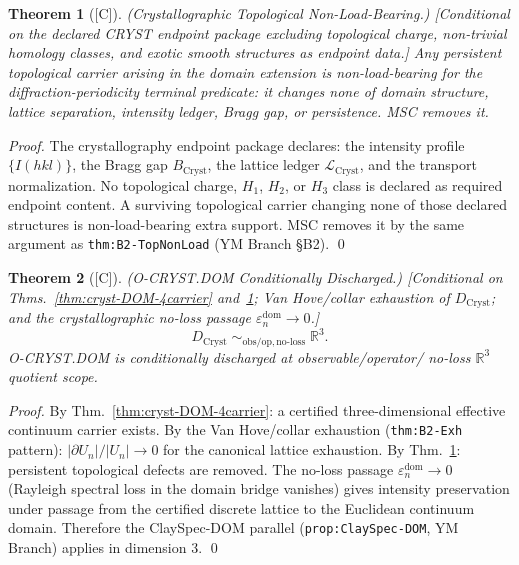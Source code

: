 \documentclass[12pt,oneside]{amsbook}
\theoremstyle{plain}
\newtheorem{theorem}{Theorem}[section]
\theoremstyle{definition}
\theoremstyle{remark}
\newcommand{\status}[1]{\textup{[#1]}}
\begin{document}
\begin{theorem}[\status{C}]\label{thm:cryst-TopNonLoad}
\textup{(Crystallographic Topological Non-Load-Bearing.)}
\textup{[Conditional on the declared CRYST endpoint package
excluding topological charge, non-trivial homology classes, and
exotic smooth structures as endpoint data.]}
Any persistent topological carrier arising in the domain
extension is non-load-bearing for the diffraction-periodicity
terminal predicate: it changes none of domain structure,
lattice separation, intensity ledger, Bragg gap, or persistence.
MSC removes it.
\end{theorem}

\begin{proof}
The crystallography endpoint package declares: the intensity
profile $\{I(hkl)\}$, the Bragg gap $B_{\mathrm{Cryst}}$, the
lattice ledger $\mathcal{L}_{\mathrm{Cryst}}$, and the transport
normalization.  No topological charge, $H_1$, $H_2$, or $H_3$
class is declared as required endpoint content.  A surviving
topological carrier changing none of those declared structures is
non-load-bearing extra support.  MSC removes it by the same
argument as \texttt{thm:B2-TopNonLoad} (YM Branch §B2).
\qed
\end{proof}

\begin{theorem}[\status{C}]\label{thm:cryst-DOM-discharged}
\textup{(O-CRYST.DOM Conditionally Discharged.)}
\textup{[Conditional on Thms.~\ref{thm:cryst-DOM-4carrier}
and~\ref{thm:cryst-TopNonLoad}; Van Hove/collar exhaustion of
$D_{\mathrm{Cryst}}$; and the crystallographic no-loss passage
$\varepsilon^{\mathrm{dom}}_n \to 0$.]}
\[
  D_{\mathrm{Cryst}} \;\sim_{\mathrm{obs/op,no\text{-}loss}}\;
  \mathbb{R}^3.
\]
O-CRYST.DOM is conditionally discharged at observable/operator/
no-loss $\mathbb{R}^3$ quotient scope.
\end{theorem}

\begin{proof}
By Thm.~\ref{thm:cryst-DOM-4carrier}: a certified three-dimensional
effective continuum carrier exists.  By the Van Hove/collar
exhaustion (\texttt{thm:B2-Exh} pattern): $|\partial U_n|/|U_n| \to 0$
for the canonical lattice exhaustion.  By Thm.~\ref{thm:cryst-TopNonLoad}:
persistent topological defects are removed.  The no-loss passage
$\varepsilon^{\mathrm{dom}}_n \to 0$ (Rayleigh spectral loss in
the domain bridge vanishes) gives intensity preservation under
passage from the certified discrete lattice to the Euclidean
continuum domain.  Therefore the ClaySpec-DOM parallel
(\texttt{prop:ClaySpec-DOM}, YM Branch) applies in dimension 3.
\qed
\end{proof}
\end{document}
